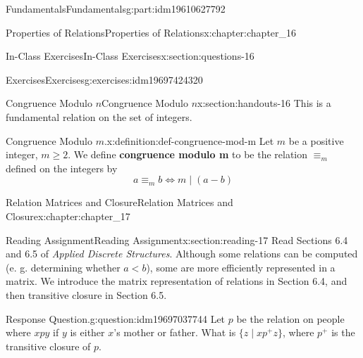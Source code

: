 \documentclass[oneside,10pt,]{book}
\newcommand{\terminology}[1]{\textbf{#1}}
\numberwithin{equation}{section}
\newcommand{\lt}{<}
\begin{document}
\begin{partptx}{Fundamentals}{}{Fundamentals}{}{}{g:part:idm19610627792}
\begin{chapterptx}{Properties of Relations}{}{Properties of Relations}{}{}{x:chapter:chapter_16}
\begin{sectionptx}{In-Class Exercises}{}{In-Class Exercises}{}{}{x:section:questions-16}
\begin{exercises-subsection-numberless}{Exercises}{}{Exercises}{}{}{g:exercises:idm19697424320}
\begin{exercisegroup}
\end{exercisegroup}
\par\medskip\noindent
\end{exercises-subsection-numberless}
\end{sectionptx}
%
%
\typeout{************************************************}
\typeout{************************************************}
%
\begin{sectionptx}{Congruence Modulo \(n\)}{}{Congruence Modulo \(n\)}{}{}{x:section:handouts-16}
This is a fundamental relation on the set of integers.%
\begin{definition}{Congruence Modulo \(m\).}{x:definition:def-congruence-mod-m}%
%
\label{g:notation:idm19697316672}%
\label{g:notation:idm19697159184}%
Let \(m\) be a positive integer, \(m\geq 2\).  We define \terminology{congruence modulo m} to be the relation \(\equiv_m\) defined on the integers by%
\begin{equation*}
a \equiv_m b \Leftrightarrow m \mid (a-b)
\end{equation*}
%
\end{definition}
\end{sectionptx}
\end{chapterptx}
%
\typeout{************************************************}
\typeout{************************************************}
%
\begin{chapterptx}{Relation Matrices and Closure}{}{Relation Matrices and Closure}{}{}{x:chapter:chapter_17}
\index{}%
%
%
\typeout{************************************************}
\typeout{************************************************}
%
\begin{sectionptx}{Reading Assignment}{}{Reading Assignment}{}{}{x:section:reading-17}
Read Sections 6.4 and 6.5 of \emph{Applied Discrete Structures}.  Although some relations can be computed (e. g. determining whether \(a \lt b\)), some are more efficiently represented in a matrix.  We introduce the matrix representation of relations in Section 6.4, and then transitive closure in Section 6.5.%
\begin{question}{Response Question.}{g:question:idm19697037744}%
Let \(p\) be the relation on people where \(x p y\) if \(y\) is either \(x\)'s mother or father.   What is \(\{z \mid x p^+ z\}\), where \(p^+\) is the transitive closure of \(p\).%
\end{question}

\end{sectionptx}
\end{chapterptx}
\end{partptx}
\end{document}
